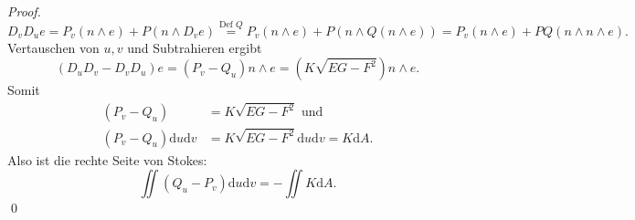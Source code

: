 \begin{theorem}
\begin{proof}
    \begin{equation*}
      D_vD_ue = P_v(n \wedge e) + P(n \wedge D_v e) \overset{\text{Def }Q}{=} P_v(n \wedge e) + P(n \wedge Q(n \wedge e)) = P_v(n \wedge e) + PQ(n \wedge n \wedge e)\text{.}
    \end{equation*}
    Vertauschen von $ u,v $ und Subtrahieren ergibt
    \begin{equation*}
      (D_uD_v - D_vD_u)e = (P_v - Q_u)n \wedge e = (K\sqrt{EG - F^2})n \wedge e\text{.}
    \end{equation*}
    Somit
    \begin{align*}
      (P_v - Q_u) &= K\sqrt{EG - F^2} \text{ und} \\
      (P_v - Q_u)\text{d}u\text{d}v &= K\sqrt{EG - F^2}\text{d}u\text{d}v = K\text{d}A\text{.}
    \end{align*}
    Also ist die rechte Seite von Stokes:
    \begin{equation*}
      \iint(Q_u - P_v)\text{d}u\text{d}v = -\iint K\text{d}A\text{.}
    \end{equation*}
    \qed
  \end{proof}
\end{theorem}